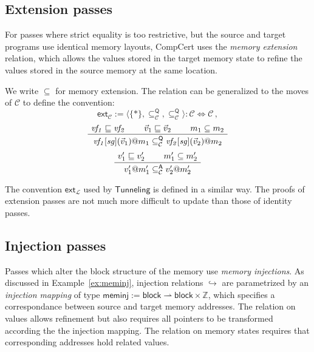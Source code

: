 \documentclass[sigplan,10pt,review,anonymous]{acmart}
\newcommand{\kw}[1]{\ensuremath{ \mathsf{#1} }}
\begin{document}

\subsection{Extension passes} %

For passes where strict equality is too restrictive,
but the source and target programs
use identical memory layouts,
CompCert uses the \emph{memory extension} relation,
which allows the values
stored in the target memory state to refine
the values stored in the source memory at the same location.

We write $\subseteq$ for memory extension.
The relation can be generalized to the moves of $\mathcal{C}$
to define the convention:
\[
    \kw{ext}_\mathcal{C} :=
      \langle \{*\},
        {\subseteq_\mathcal{C}^\kw{Q}},
        {\subseteq_\mathcal{C}^\kw{Q}}
      \rangle
      : \mathcal{C} \Leftrightarrow \mathcal{C} \,,
\]
\[
    \AxiomC{$\mathit{vf_1} \sqsubseteq \mathit{vf_2}$}
    \AxiomC{$\vec{v}_1 \sqsubseteq \vec{v}_2$}
    \AxiomC{$m_1 \subseteq m_2$}
    \TrinaryInfC{$\mathit{vf_1}[\mathit{sg}](\vec{v}_1)@m_1
      \subseteq_\mathcal{C}^\kw{Q}
      \mathit{vf_2}[\mathit{sg}](\vec{v}_2)@m_2$}
    \DisplayProof
\]
\[
    \AxiomC{$v_1' \sqsubseteq v_2'$}
    \AxiomC{$m_1' \subseteq m_2'$}
    \BinaryInfC{$v_1'@m_1' \subseteq_\mathcal{C}^\kw{A} v_2'@m_2'$}
    \DisplayProof
\]

The convention $\kw{ext}_{\!\mathcal{L}}$
used by $\kw{Tunneling}$
is defined in a similar way.
The proofs of extension passes are not much more difficult to update
than those of identity passes.


\subsection{Injection passes} \label{sec:pass:inj} %

Passes which alter the block structure of the memory
use \emph{memory injections}.
As discussed in Example~\ref{ex:meminj},
injection relations $\hookrightarrow$
are parametrized by an \emph{injection mapping}
of type
$\kw{meminj} :=
\kw{block} \rightharpoonup \kw{block} \times \mathbb{Z}$,
which specifies a correspondance between
source and target memory addresses.
The relation on values
allows refinement but also requires
all pointers to be transformed
according the the injection mapping.
The relation on memory states
requires that corresponding addresses
hold related values.
\end{document}
